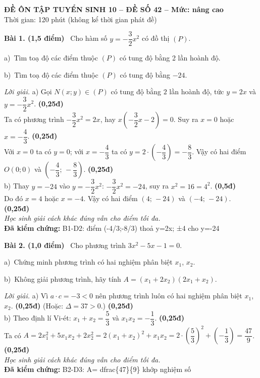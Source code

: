 \documentclass[12pt,a4paper]{article}
\newif\ifloigiai \loigiaitrue   %
\newenvironment{bai}[4]{\par\medskip\noindent\textbf{Bài #1. (#2 điểm)}\ }{\par}
\newcommand{\y}[2]{\par\hspace*{1em}#1)~#2}             %
\newcommand{\loigiai}[1]{\ifloigiai\par\smallskip\noindent\textit{Lời giải.} #1\par\fi}
\newcommand{\diem}[1]{\ifloigiai\hfill\textbf{(#1đ)}\fi}  %
\begin{document}
\begin{center}\textbf{ĐỀ ÔN TẬP TUYỂN SINH 10 – ĐỀ SỐ 42 – Mức: nâng cao}\\ Thời gian: 120 phút (không kể thời gian phát đề)\end{center}

\begin{bai}{1}{1,5}{B1-D2}{TS10-D42-B1}
Cho hàm số $y=-\dfrac{3}{2}x^2$ có đồ thị $(P)$.
\y{a}{Tìm toạ độ các điểm thuộc $(P)$ có tung độ bằng 2 lần hoành độ.}
\y{b}{Tìm toạ độ các điểm thuộc $(P)$ có tung độ bằng $-24$.}
\loigiai{
a) Gọi $N(x;y)\in(P)$ có tung độ bằng $2$ lần hoành độ, tức $y=2x$ và $y=-\dfrac{3}{2}x^2$. \diem{0,25}\\
Ta có phương trình $-\dfrac{3}{2}x^2=2x$, hay $x\left(-\dfrac{3}{2}x-2\right)=0$. Suy ra $x=0$ hoặc $x=-\dfrac{4}{3}$. \diem{0,25}\\
Với $x=0$ ta có $y=0$; với $x=-\dfrac{4}{3}$ ta có $y=2\cdot(-\dfrac{4}{3})=-\dfrac{8}{3}$. Vậy có hai điểm $O(0;0)$ và $(-\dfrac{4}{3};\,-\dfrac{8}{3})$. \diem{0,25}\\
b) Thay $y=-24$ vào $y=-\dfrac{3}{2}x^2$: $-\dfrac{3}{2}x^2=-24$, suy ra $x^2=16=4^2$. \diem{0,5}\\
Do đó $x=4$ hoặc $x=-4$. Vậy có hai điểm $(4;\,-24)$ và $(-4;\,-24)$. \diem{0,25}
\\\textit{Học sinh giải cách khác đúng vẫn cho điểm tối đa.}\\
\textbf{Đã kiểm chứng:} B1-D2: điểm (-4/3;-8/3) thoả y=2x; ±4 cho y=-24
}
\end{bai}

\begin{bai}{2}{1,0}{B2-D3}{TS10-D42-B2}
Cho phương trình $3x^2-5x-1=0$.
\y{a}{Chứng minh phương trình có hai nghiệm phân biệt $x_1$, $x_2$.}
\y{b}{Không giải phương trình, hãy tính $A=(x_1+2x_2)(2x_1+x_2)$.}
\loigiai{
a) Vì $a\cdot c=-3<0$ nên phương trình luôn có hai nghiệm phân biệt $x_1$, $x_2$. \diem{0,25} (Hoặc: $\Delta=37>0$.) \diem{0,25}\\[2pt]
b) Theo định lí Vi-ét: $x_1+x_2=\dfrac{5}{3}$ và $x_1x_2=-\dfrac{1}{3}$. \diem{0,25}\\
Ta có $A=2x_1^2+5x_1x_2+2x_2^2=2(x_1+x_2)^2+x_1x_2=2\cdot(\dfrac{5}{3})^2+(-\dfrac{1}{3})=\dfrac{47}{9}$. \diem{0,25}
\\\textit{Học sinh giải cách khác đúng vẫn cho điểm tối đa.}\\
\textbf{Đã kiểm chứng:} B2-D3: A= dfrac\{47\}\{9\} khớp nghiệm số
}
\end{bai}
\end{document}
